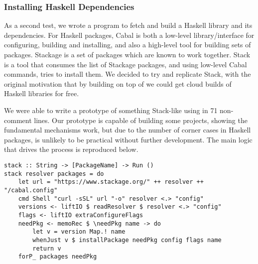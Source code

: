 \subsubsection{Installing Haskell Dependencies}

As a second test, we wrote a program to fetch and build a Haskell library and its dependencies. For Haskell packages, Cabal is both a low-level library/interface for configuring, building and installing, and also a high-level tool for building sets of packages. Stackage is a set of packages which are known to work together. Stack is a tool that consumes the list of Stackage packages, and using low-level Cabal commands, tries to install them. We decided to try and replicate Stack, with the original motivation that by building on top of \Rattle we could get cloud builds of Haskell libraries for free.

We were able to write a prototype of something Stack-like using \Rattle in 71 non-comment lines. Our prototype is capable of building some projects, showing the fundamental mechanisms work, but due to the number of corner cases in Haskell packages, is unlikely to be practical without further development. The main logic that drives the process is reproduced below.

\begin{small}
\begin{verbatim}
stack :: String -> [PackageName] -> Run ()
stack resolver packages = do
    let url = "https://www.stackage.org/" ++ resolver ++ "/cabal.config"
    cmd Shell "curl -sSL" url "-o" resolver <.> "config"
    versions <- liftIO $ readResolver $ resolver <.> "config"
    flags <- liftIO extraConfigureFlags
    needPkg <- memoRec $ \needPkg name -> do
        let v = version Map.! name
        whenJust v $ installPackage needPkg config flags name
        return v
    forP_ packages needPkg
\end{verbatim}
\end{small}

